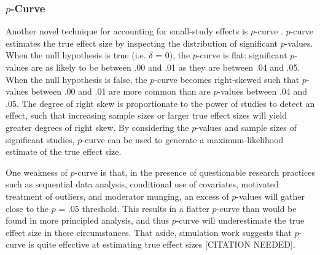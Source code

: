 \documentclass[man]{apa6}
\begin{document}
\subsubsection{$p$-Curve}
Another novel technique for accounting for small-study effects is $p$-curve \citep{Simonsohn:etal:2014}. $p$-curve estimates the true effect size by inspecting the distribution of significant $p$-values. When the null hypothesis is true (i.e. $\delta$ = 0), the $p$-curve is flat: significant $p$-values are as likely to be between .00 and .01 as they are between .04 and .05. When the null hypothesis is false, the $p$-curve becomes right-skewed such that $p$-values between .00 and .01 are more common than are $p$-values between .04 and .05. The degree of right skew is proportionate to the power of studies to detect an effect, such that increasing sample sizes or larger true effect sizes will yield greater degrees of right skew. By considering the $p$-values and sample sizes of significant studies, $p$-curve can be used to generate a maximum-likelihood estimate of the true effect size.

One weakness of $p$-curve is that, in the presence of questionable research practices such as sequential data analysis, conditional use of covariates, motivated treatment of outliers, and moderator munging, an excess of $p$-values will gather close to the $p$ = .05 threshold. This results in a flatter $p$-curve than would be found in more principled analysis, and thus $p$-curve will underestimate the true effect size in these circumstances. That aside, simulation work suggests that $p$-curve is quite effective at estimating true effect sizes [CITATION NEEDED].
\end{document}
